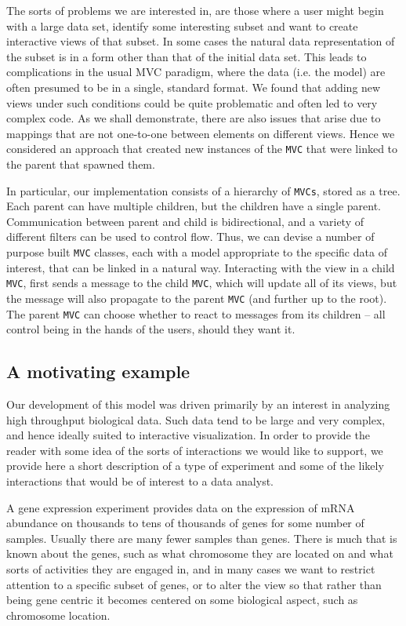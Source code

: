 \documentclass{article}[11pt]
\newcommand{\Robject}[1]{{\texttt{#1}}}
\newcommand{\Rclass}[1]{\texttt{#1}}
\begin{document}
The sorts of problems we are interested in, are those where a user
might begin with a large data set, identify some interesting subset
and want to create interactive views of that subset.  In some cases the
natural data representation of the subset is in a form other than that
of the initial data set.  This leads to complications in the usual MVC
paradigm, where the data (i.e. the model) are often presumed to be in
a single, standard format.  We found that adding new views under such
conditions could be quite problematic and often led to very complex
code.  As we shall demonstrate, there are also issues that arise due to
mappings that are not one-to-one between elements on different views.
Hence we considered an approach that created new instances of
the \Robject{MVC} that were linked to the parent that spawned them.

In particular, our implementation consists of a hierarchy of \Robject{MVCs},
stored as a tree.  Each parent can have multiple children, but the
children have a single parent.  Communication between parent and
child is bidirectional, and a variety of different filters can be used
to control flow.  Thus, we can devise a number of purpose built \Rclass{MVC}
classes, each with a model appropriate to the specific data of
interest, that can be linked in a natural way.  Interacting with the view
in a child \Robject{MVC}, first sends a message to the child \Robject{MVC},
which will update all of its views, but the message will also propagate to the
parent \Robject{MVC} (and further up to the root).  The parent \Robject{MVC}
can choose whether to react to messages from its children -- all control being
in the hands of the users, should they want it.

\subsection*{A motivating example}
\label{sec:micro}

Our development of this model was driven primarily by an interest in
analyzing high throughput biological data.  Such data tend to be large
and very complex, and hence ideally suited to interactive
visualization.  In order to provide the reader with some idea of the
sorts of interactions we would like to support, we provide here a short
description of a type of experiment and some of the likely
interactions that would be of interest to a data analyst.

A gene expression experiment provides data on the expression of mRNA
abundance on thousands to tens of thousands of genes for some number
of samples.  Usually there are many fewer samples than genes.  There is
much that is known about the genes, such as what chromosome they are
located on and what sorts of activities they are engaged in, and in many
cases we want to restrict attention to a specific subset of genes, or
to alter the view so that rather than being gene centric it becomes
centered on some biological aspect, such as chromosome location.
\end{document}
